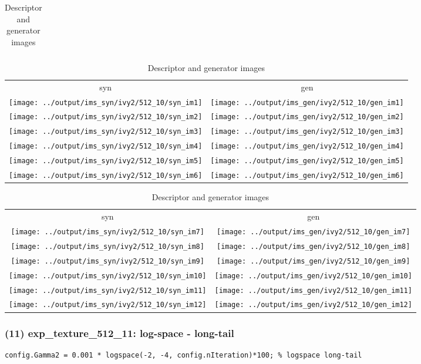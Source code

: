 \documentclass[letter]{article}
\begin{document}
\begin{table}[h!]
\begin{tabular}{c}
	\end{tabular}
	\begin{tabular}{cc}
		syn & gen\tabularnewline
		\texttt{[image: ../output/ims\_syn/ivy2/512\_10/syn\_im1]} & \texttt{[image: ../output/ims\_gen/ivy2/512\_10/gen\_im1]} \tabularnewline
		\texttt{[image: ../output/ims\_syn/ivy2/512\_10/syn\_im2]} & \texttt{[image: ../output/ims\_gen/ivy2/512\_10/gen\_im2]} \tabularnewline
		\texttt{[image: ../output/ims\_syn/ivy2/512\_10/syn\_im3]} & \texttt{[image: ../output/ims\_gen/ivy2/512\_10/gen\_im3]} \tabularnewline
		\texttt{[image: ../output/ims\_syn/ivy2/512\_10/syn\_im4]} & \texttt{[image: ../output/ims\_gen/ivy2/512\_10/gen\_im4]} \tabularnewline
		\texttt{[image: ../output/ims\_syn/ivy2/512\_10/syn\_im5]} & \texttt{[image: ../output/ims\_gen/ivy2/512\_10/gen\_im5]} \tabularnewline
		\texttt{[image: ../output/ims\_syn/ivy2/512\_10/syn\_im6]} & \texttt{[image: ../output/ims\_gen/ivy2/512\_10/gen\_im6]} \tabularnewline
	\end{tabular}
	\begin{tabular}{cc}
		syn & gen\tabularnewline
		\texttt{[image: ../output/ims\_syn/ivy2/512\_10/syn\_im7]} & \texttt{[image: ../output/ims\_gen/ivy2/512\_10/gen\_im7]} \tabularnewline
		\texttt{[image: ../output/ims\_syn/ivy2/512\_10/syn\_im8]} & \texttt{[image: ../output/ims\_gen/ivy2/512\_10/gen\_im8]} \tabularnewline
		\texttt{[image: ../output/ims\_syn/ivy2/512\_10/syn\_im9]} & \texttt{[image: ../output/ims\_gen/ivy2/512\_10/gen\_im9]} \tabularnewline
		\texttt{[image: ../output/ims\_syn/ivy2/512\_10/syn\_im10]} & \texttt{[image: ../output/ims\_gen/ivy2/512\_10/gen\_im10]} \tabularnewline
		\texttt{[image: ../output/ims\_syn/ivy2/512\_10/syn\_im11]} & \texttt{[image: ../output/ims\_gen/ivy2/512\_10/gen\_im11]} \tabularnewline
		\texttt{[image: ../output/ims\_syn/ivy2/512\_10/syn\_im12]} & \texttt{[image: ../output/ims\_gen/ivy2/512\_10/gen\_im12]} \tabularnewline
	\end{tabular}
	\caption{Descriptor and generator images}
\end{table}
\newpage

\subsubsection*{(11) exp\_texture\_512\_11: log-space - long-tail}

\begin{lstlisting}
config.Gamma2 = 0.001 * logspace(-2, -4, config.nIteration)*100; % logspace long-tail
\end{lstlisting}
\end{document}
